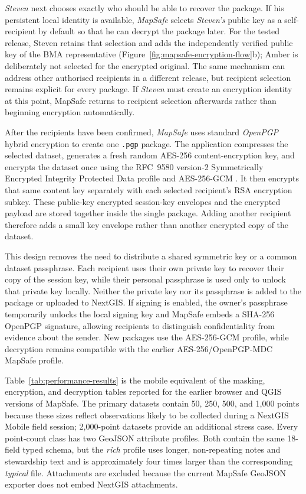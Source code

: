 \documentclass[]{interact}
\begin{document}
\textit{Steven} next chooses exactly who should be able to recover the package. If his persistent local identity is available, \textit{MapSafe} selects \textit{Steven's} public key as a self-recipient by default so that he can decrypt the package later. For the tested release, Steven retains that selection and adds the independently verified public key of the BMA representative (Figure~\ref{fig:mapsafe-encryption-flow}b); Amber is deliberately not selected for the encrypted original. The same mechanism can address other authorised recipients in a different release, but recipient selection remains explicit for every package. If \textit{Steven} must create an encryption identity at this point, MapSafe returns to recipient selection afterwards rather than beginning encryption automatically.

After the recipients have been confirmed, \textit{MapSafe} uses standard \textit{OpenPGP} hybrid encryption to create one \texttt{.pgp} package. The application compresses the selected dataset, generates a fresh random AES-256 content-encryption key, and encrypts the dataset once using the RFC~9580 version-2 Symmetrically Encrypted Integrity Protected Data profile and AES-256-GCM \citep{wouters2024openpgp}. It then encrypts that same content key separately with each selected recipient's RSA encryption subkey. These public-key encrypted session-key envelopes and the encrypted payload are stored together inside the single package. Adding another recipient therefore adds a small key envelope rather than another encrypted copy of the dataset.

This design removes the need to distribute a shared symmetric key or a common dataset passphrase. Each recipient uses their own private key to recover their copy of the session key, while their personal passphrase is used only to unlock that private key locally. Neither the private key nor its passphrase is added to the package or uploaded to NextGIS. If signing is enabled, the owner's passphrase temporarily unlocks the local signing key and MapSafe embeds a SHA-256 OpenPGP signature, allowing recipients to distinguish confidentiality from evidence about the sender. New packages use the AES-256-GCM profile, while decryption remains compatible with the earlier AES-256/OpenPGP-MDC MapSafe profile.







Table~\ref{tab:performance-results} is the mobile equivalent of the masking, encryption, and decryption tables reported for the earlier browser and QGIS versions of MapSafe. The primary datasets contain 50, 250, 500, and 1,000 points because these sizes reflect observations likely to be collected during a NextGIS Mobile field session; 2,000-point datasets provide an additional stress case. Every point-count class has two GeoJSON attribute profiles. Both contain the same 18-field typed schema, but the \emph{rich} profile uses longer, non-repeating notes and stewardship text and is approximately four times larger than the corresponding \emph{typical} file. Attachments are excluded because the current MapSafe GeoJSON exporter does not embed NextGIS attachments.
\end{document}
